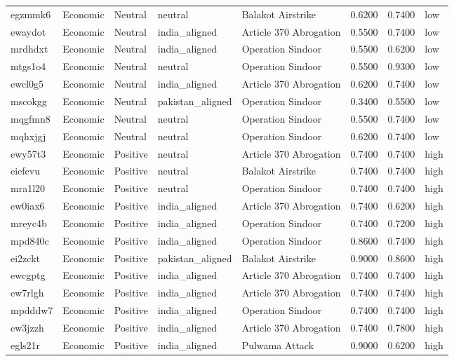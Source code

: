 \begin{longtable}{lllllrrl}
egzmmk6 & Economic & Neutral & neutral & Balakot Airstrike & 0.6200 & 0.7400 & low \\
ewaydot & Economic & Neutral & india\_aligned & Article 370 Abrogation & 0.5500 & 0.7400 & low \\
mrdhdxt & Economic & Neutral & india\_aligned & Operation Sindoor & 0.5500 & 0.6200 & low \\
mtgs1o4 & Economic & Neutral & neutral & Operation Sindoor & 0.5500 & 0.9300 & low \\
ewcl0g5 & Economic & Neutral & india\_aligned & Article 370 Abrogation & 0.6200 & 0.7400 & low \\
mscokgg & Economic & Neutral & pakistan\_aligned & Operation Sindoor & 0.3400 & 0.5500 & low \\
mqgfmn8 & Economic & Neutral & neutral & Operation Sindoor & 0.5500 & 0.7400 & low \\
mqhxjgj & Economic & Neutral & neutral & Operation Sindoor & 0.6200 & 0.7400 & low \\
ewy57t3 & Economic & Positive & neutral & Article 370 Abrogation & 0.7400 & 0.7400 & high \\
eiefcvu & Economic & Positive & neutral & Balakot Airstrike & 0.7400 & 0.7400 & high \\
mra1l20 & Economic & Positive & neutral & Operation Sindoor & 0.7400 & 0.7400 & high \\
ew0iax6 & Economic & Positive & india\_aligned & Article 370 Abrogation & 0.7400 & 0.6200 & high \\
mreyc4b & Economic & Positive & india\_aligned & Operation Sindoor & 0.7400 & 0.7200 & high \\
mpd840c & Economic & Positive & india\_aligned & Operation Sindoor & 0.8600 & 0.7400 & high \\
ei2zckt & Economic & Positive & pakistan\_aligned & Balakot Airstrike & 0.9000 & 0.8600 & high \\
ewcgptg & Economic & Positive & india\_aligned & Article 370 Abrogation & 0.7400 & 0.7400 & high \\
ew7rlgh & Economic & Positive & india\_aligned & Article 370 Abrogation & 0.7400 & 0.7400 & high \\
mpdddw7 & Economic & Positive & india\_aligned & Operation Sindoor & 0.7400 & 0.7400 & high \\
ew3jzzh & Economic & Positive & india\_aligned & Article 370 Abrogation & 0.7400 & 0.7800 & high \\
egls21r & Economic & Positive & india\_aligned & Pulwama Attack & 0.9000 & 0.6200 & high \\

\end{longtable}
